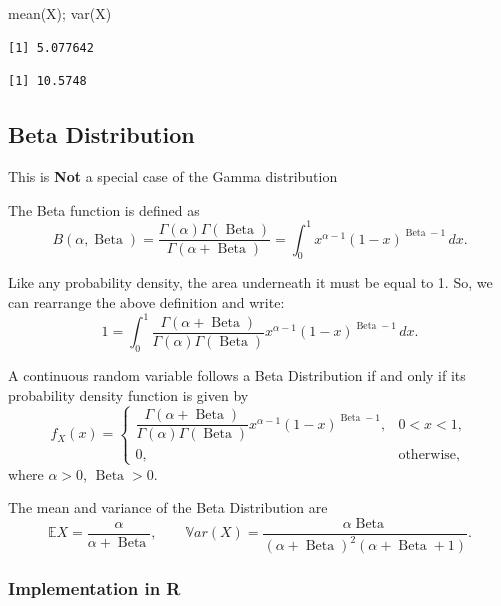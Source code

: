 \documentclass[
  letterpaper,
  DIV=11,
  numbers=noendperiod]{scrreprt}
\newenvironment{Shaded}{\begin{snugshade}}{\end{snugshade}}
\newcommand{\FunctionTok}[1]{\textcolor[rgb]{0.28,0.35,0.67}{#1}}
\newcommand{\NormalTok}[1]{\textcolor[rgb]{0.00,0.23,0.31}{#1}}
\begin{document}
\begin{Shaded}
\begin{Highlighting}[]
\FunctionTok{mean}\NormalTok{(X);  }\FunctionTok{var}\NormalTok{(X)}
\end{Highlighting}
\end{Shaded}

\begin{verbatim}
[1] 5.077642
\end{verbatim}

\begin{verbatim}
[1] 10.5748
\end{verbatim}

\subsection{Beta Distribution}\label{beta-distribution}

This is \textbf{Not} a special case of the Gamma distribution

The Beta function is defined as \[
B(\alpha, \operatorname{Beta}) = \frac{\Gamma(\alpha)\Gamma(\operatorname{Beta})}{\Gamma(\alpha + \operatorname{Beta})}
= \int_0^1 x^{\alpha - 1} (1-x)^{\operatorname{Beta}- 1} \, dx.\]

Like any probability density, the area underneath it must be equal to 1.
So, we can rearrange the above definition and write:
\[1 = \int_0^1 \frac{\Gamma(\alpha+\operatorname{Beta})}{\Gamma(\alpha)\Gamma(\operatorname{Beta})}
x^{\alpha-1} (1-x)^{\operatorname{Beta}-1} \, dx.\]

A continuous random variable follows a Beta Distribution if and only if
its probability density function is given by \[
f_X(x) =
\begin{cases}
\dfrac{\Gamma(\alpha+\operatorname{Beta})}{\Gamma(\alpha)\Gamma(\operatorname{Beta})}
x^{\alpha-1}(1-x)^{\operatorname{Beta}-1}, & 0 < x < 1, \\[2ex]
0, & \text{otherwise},
\end{cases}\] where \(\alpha > 0\), \(\operatorname{Beta}> 0\).

The mean and variance of the Beta Distribution are
\[\mathbb EX = \frac{\alpha}{\alpha + \operatorname{Beta}},
\qquad
\mathbb{V}ar(X) = \frac{\alpha \operatorname{Beta}}{(\alpha + \operatorname{Beta})^2 (\alpha + \operatorname{Beta}+ 1)}.
\]

\subsubsection{Implementation in R}\label{implementation-in-r-7}
\end{document}
